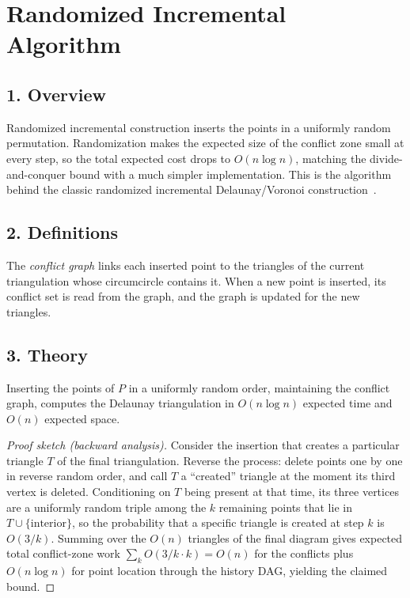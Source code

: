 \section{Randomized Incremental Algorithm}
\label{sec:delaunay_randomized}

\subsection{1. Overview}

Randomized incremental construction
inserts the points in a uniformly random permutation. Randomization makes the
expected size of the conflict zone small at every step, so the total expected
cost drops to $O(n \log n)$, matching the divide-and-conquer bound with a much
simpler implementation. This is the algorithm behind the classic randomized
incremental Delaunay/Voronoi construction~\cite{guibas1992}.

\subsection{2. Definitions}

\begin{definition}\label{def:conflict_graph}
The \emph{conflict graph} links each inserted point to the triangles of the
current triangulation whose circumcircle contains it. When a new point is
inserted, its conflict set is read from the graph, and the graph is updated for
the new triangles.
\end{definition}

\subsection{3. Theory}

\begin{theorem}\label{thm:randomized_delaunay}
Inserting the points of $P$ in a uniformly random order, maintaining the
conflict graph, computes the Delaunay triangulation in $O(n \log n)$ expected
time and $O(n)$ expected space.
\end{theorem}

\begin{proof}[Proof sketch (backward analysis)]
Consider the insertion that creates a particular triangle $T$ of the final
triangulation. Reverse the process: delete points one by one in reverse random
order, and call $T$ a ``created'' triangle at the moment its third vertex is
deleted. Conditioning on $T$ being present at that time, its three vertices are
a uniformly random triple among the $k$ remaining points that lie in
$T \cup \{\text{interior}\}$, so the probability that a specific triangle is
created at step $k$ is $O(3/k)$. Summing over the $O(n)$ triangles of the final
diagram gives expected total conflict-zone work $\sum_k O(3/k \cdot k) = O(n)$
for the conflicts plus $O(n \log n)$ for point location through the history
DAG, yielding the claimed bound.
\end{proof}

